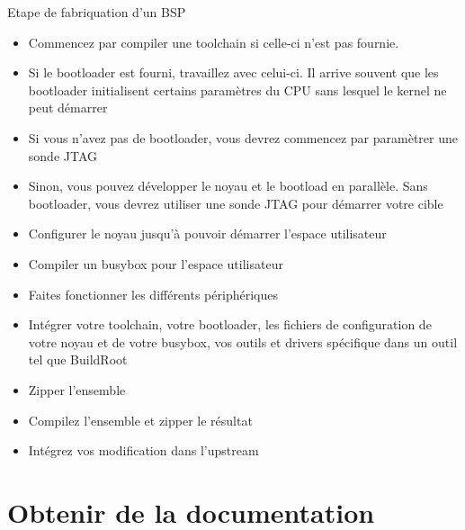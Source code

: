 \begin{frame}[fragile=singleslide]{Etape de fabriquation d'un BSP}
  \begin{itemize}
  \item  Commencez par compiler  une toolchain  si celle-ci  n'est pas
    fournie.
  \item  Si le  bootloader est  fourni, travaillez  avec  celui-ci. Il
    arrive souvent que les bootloader initialisent certains paramètres
    du CPU sans lesquel le kernel ne peut démarrer
  \item Si  vous n'avez pas  de bootloader, vous devrez  commencez par
    paramètrer une sonde JTAG
  \item  Sinon, vous  pouvez développer  le  noyau et  le bootload  en
    parallèle. Sans  bootloader, vous  devrez utiliser une  sonde JTAG
    pour démarrer votre cible
  \item  Configurer   le  noyau  jusqu'à   pouvoir  démarrer  l'espace
    utilisateur
  \item Compiler un busybox pour l'espace utilisateur
  \item Faites fonctionner les différents périphériques
  \item Intégrer  votre toolchain,  votre bootloader, les  fichiers de
    configuration de  votre noyau et  de votre busybox, vos  outils et
    drivers spécifique dans un outil tel que BuildRoot
  \item Zipper l'ensemble
  \item Compilez l'ensemble et zipper le résultat
  \item Intégrez vos modification dans l'upstream
  \end{itemize}
\end{frame} 




\section{Obtenir de la documentation}


